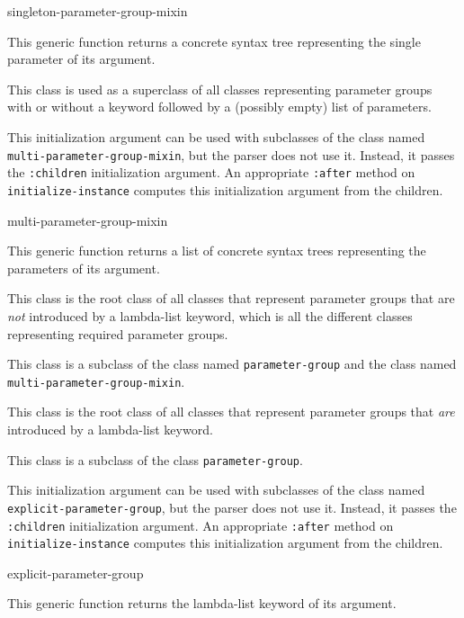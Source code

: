  {singleton-parameter-group-mixin}

This generic function returns a concrete syntax tree representing the
single parameter of its argument.


This class is used as a superclass of all classes representing
parameter groups with or without a keyword followed by a (possibly
empty) list of parameters.


This initialization argument can be used with subclasses of the class
named \texttt{multi-parameter-group-mixin}, but the parser does
not use it.  Instead, it passes the \texttt{:children} initialization
argument.  An appropriate \texttt{:after} method on
\texttt{initialize-instance} computes this initialization argument
from the children.

 {multi-parameter-group-mixin}

This generic function returns a list of concrete syntax trees
representing the parameters of its argument.


This class is the root class of all classes that represent parameter
groups that are \emph{not} introduced by a lambda-list keyword, which
is all the different classes representing required parameter groups.

This class is a subclass of the class named \texttt{parameter-group}
and the class named \texttt{multi-parameter-group-mixin}.


This class is the root class of all classes that represent parameter
groups that \emph{are} introduced by a lambda-list keyword.

This class is a subclass of the class \texttt{parameter-group}.


This initialization argument can be used with subclasses of the class
named \texttt{explicit-parameter-group}, but the parser does not use
it.  Instead, it passes the \texttt{:children} initialization
argument.  An appropriate \texttt{:after} method on
\texttt{initialize-instance} computes this initialization argument
from the children.

 {explicit-parameter-group}

This generic function returns the lambda-list keyword of its argument.

